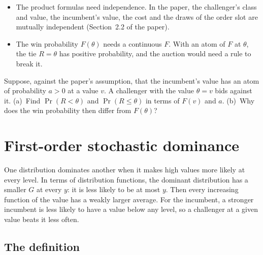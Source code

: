 \begin{watchout}
\begin{itemize}
\item The product formulas need independence. In the paper, the challenger's class and value, the incumbent's
value, the cost and the draws of the order slot are mutually independent (Section~2.2 of the paper).
\item The win probability \(F(\theta)\) needs a continuous \(F\). With an atom of \(F\) at \(\theta\), the tie
\(R=\theta\) has positive probability, and the auction would need a rule to break it.
\end{itemize}
\end{watchout}

\begin{checkyourself}\label{q:toolkit-maxmin}
Suppose, against the paper's assumption, that the incumbent's value has an atom of probability \(a>0\) at a value
\(v\). A challenger with the value \(\theta=v\) bids against it.
(a)~Find \(\Pr(R<\theta)\) and \(\Pr(R\le\theta)\) in terms of \(F(v)\) and \(a\).
(b)~Why does the win probability then differ from \(F(\theta)\)?
\end{checkyourself}

\section{First-order stochastic dominance}\label{sec:toolkit-fosd}

\begin{intuition}
One distribution dominates another when it makes high values more likely at every level. In terms of
distribution functions, the dominant distribution has a smaller \(G\) at every \(y\): it is less likely to be at
most \(y\). Then every increasing function of the value has a weakly larger average. For the incumbent, a stronger
incumbent is less likely to have a value below any level, so a challenger at a given value beats it less often.
\end{intuition}

\subsection{The definition}

